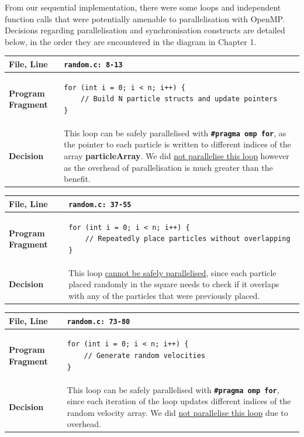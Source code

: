 \documentclass[12pt]{article}
\newcommand{\bt}[1]{\texttt{\textbf{#1}}}
\begin{document}
From our sequential implementation, there were some loops and independent function calls that were potentially amenable to parallelisation with OpenMP. \\

Decisions regarding parallelisation and synchronisation constructs are detailed below, in the order they are encountered in the diagram in Chapter 1.

\begin{center}
\begin{tabular}{ | m{5em} | m{33em} | } 
\hline
\textbf{File, Line} & \bt{random.c: 8-13} \\ \hline
\textbf{Program Fragment} &
\begin{verbatim}
for (int i = 0; i < n; i++) {
    // Build N particle structs and update pointers
}
\end{verbatim}
\\ \hline
\textbf{Decision} &
This loop can be safely parallelised with \bt{\#pragma omp for}, as the pointer to each particle is written to different indices of the array \textbf{particleArray}. We did \ul{not parallelise this loop} however as the overhead of parallelisation is much greater than the benefit.
\\ \hline
\end{tabular}
\end{center}

\begin{center}
\begin{tabular}{ | m{5em} | m{33em} | } 
\hline
\textbf{File, Line} & \bt{random.c: 37-55} \\ \hline
\textbf{Program Fragment} &
\begin{verbatim}
for (int i = 0; i < n; i++) {
    // Repeatedly place particles without overlapping
}
\end{verbatim}
\\ \hline
\textbf{Decision} &
This loop \ul{cannot be safely parallelised}, since each particle placed randomly in the square needs to check if it overlaps with any of the particles that were previously placed.
\\ \hline
\end{tabular}
\end{center}

\begin{center}
\begin{tabular}{ | m{5em} | m{33em} | } 
\hline
\textbf{File, Line} & \bt{random.c: 73-80} \\ \hline
\textbf{Program Fragment} &
\begin{verbatim}
for (int i = 0; i < n; i++) {
    // Generate random velocities
}
\end{verbatim}
\\ \hline
\textbf{Decision} &
This loop can be safely parallelised with \bt{\#pragma omp for}, since each iteration of the loop updates different indices of the random velocity array. We did \ul{not parallelise this loop} due to overhead.
\\ \hline
\end{tabular}
\end{center}
\end{document}
